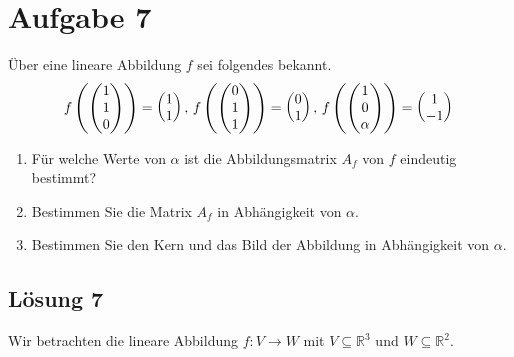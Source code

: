 \documentclass[main.tex]{subfiles}
\begin{document}
\arraycolsep=1pt
\section{Aufgabe 7}
Über eine lineare Abbildung $f$ sei folgendes bekannt.
$$
    f\left(\begin{pmatrix}
        1 \\ 1 \\ 0
    \end{pmatrix}\right) = \begin{pmatrix}
        1 \\ 1
    \end{pmatrix},\,
    f\left(\begin{pmatrix}
        0 \\ 1 \\ 1
    \end{pmatrix}\right) = \begin{pmatrix}
        0 \\ 1
    \end{pmatrix},\,
    f\left(\begin{pmatrix}
        1 \\ 0 \\ \alpha
    \end{pmatrix}\right) = \begin{pmatrix}
        1 \\ -1
    \end{pmatrix}\\
    $$

\begin{enumerate}
    \item Für welche Werte von $\alpha$ ist die Abbildungsmatrix $A_f$ von $f$ eindeutig bestimmt?
    \item Bestimmen Sie die Matrix $A_f$ in Abhängigkeit von $\alpha$.
    \item Bestimmen Sie den Kern und das Bild der Abbildung in Abhängigkeit von $\alpha$.
\end{enumerate}

\subsection{Lösung 7}
Wir betrachten die lineare Abbildung $f : V \to W$ mit $V \subseteq \mathbb{R}^3$ und $W \subseteq \mathbb{R}^2$.
\end{document}
